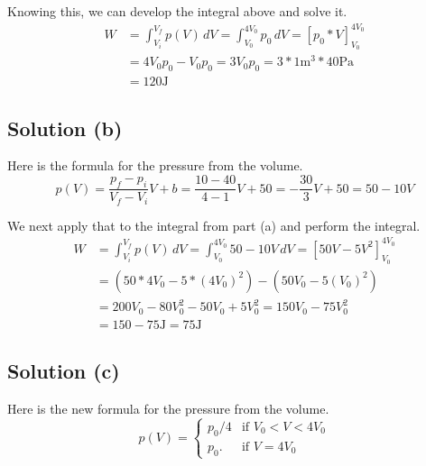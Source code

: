 \documentclass[12pt]{article}
\begin{document}
            Knowing this, we can develop the integral above and solve it.
            \begin{align}
                W   &=  \int_{V_i}^{V_f} p(V) \,dV 
                    =   \int_{V_0}^{4V_0} p_0 \,dV
                    =   \left[ p_0*V \right]_{V_0}^{4V_0}\\
                    &=  4 V_0 p_0 - V_0 p_0
                    =   3 V_0 p_0
                    =   3 * 1 \unit{\meter^3} * 40 \unit{\pascal}\\
                    &=  \boxed{120 \unit{\joule}}
            \end{align}

        \subsection{Solution (b)}
            Here is the formula for the pressure from the volume.
            \begin{equation}
                p(V)    = \frac{p_f - p_i}{V_f - V_i}V + b    = \frac{10 - 40}{4 - 1} V + 50  = -\frac{30}{3} V + 50  = 50 - 10V 
            \end{equation}

            We next apply that to the integral from part (a) and perform the integral.
            \begin{align}
                W   &=  \int_{V_i}^{V_f} p(V) \,dV 
                    =   \int_{V_0}^{4V_0} 50 - 10V \,dV
                    =   \left[ 50V - 5 V^2 \right]_{V_0}^{4V_0}\\
                    &=  \left( 50 * 4V_0 - 5*(4 V_0)^2 \right) - \left( 50 V_0 - 5 (V_0)^2 \right)\\
                    &=  200 V_0 - 80 V_0^2 - 50 V_0 + 5 V_0^2
                    =   150 V_0 - 75 V_0^2\\
                    &=  150 - 75 \unit{\joule}
                    =   \boxed{75 \unit{\joule}}
            \end{align}

        \subsection{Solution (c)}
            Here is the new formula for the pressure from the volume.
            \begin{equation}
                p(V) = \begin{cases}
                    p_0/4   &\text{if } V_0 < V < 4 V_0\\
                    p_0.    &\text{if } V = 4 V_0
                \end{cases}
            \end{equation}
\end{document}
